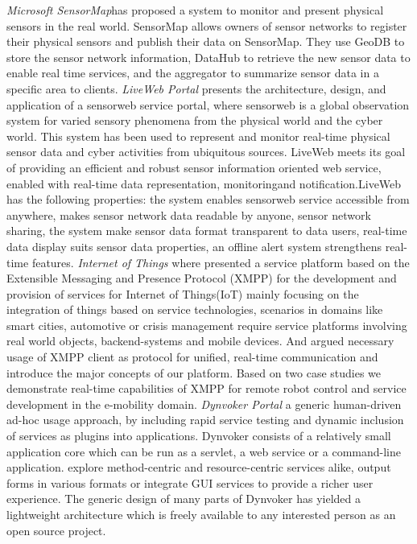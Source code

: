 \newline
	\emph{Microsoft SensorMap\cite{nath2007sensormap}}has proposed a system to monitor and present physical sensors in the real world. SensorMap allows owners of sensor networks to register their physical sensors and publish their data on SensorMap. They use GeoDB to store the sensor network information, DataHub to retrieve the new sensor data to enable real time services, and the aggregator to summarize sensor data in a specific area to clients.
\newline
	 \emph{LiveWeb Portal}\cite{yang2011liveweb} presents the architecture, design, and application of a sensorweb service portal, where sensorweb is a global observation system for varied sensory phenomena from the physical world and the cyber world. This system has been used to represent and monitor real-time physical sensor data and cyber activities from ubiquitous sources. LiveWeb meets its goal of providing an efficient and robust sensor information oriented web service, enabled with real-time data representation, monitoringand notification.LiveWeb has the following properties: the system enables sensorweb service accessible from anywhere, makes sensor network data readable by anyone, sensor network sharing, the system make sensor data format transparent to data users, real-time data display suits sensor data properties, an offline alert system strengthens real-time features.
\newline
	\emph{Internet of Things}\cite{bendel2013service} where presented a service platform based on the Extensible Messaging and Presence Protocol (XMPP) for the development and provision of services for Internet of Things(IoT) mainly focusing on the integration of things based on service technologies, scenarios in domains like smart cities, automotive or crisis management require service
	platforms involving real world objects, backend-systems and mobile devices. And argued necessary usage of
    XMPP client as protocol for unified, real-time communication and introduce the major concepts of our platform. Based on two case studies we demonstrate real-time capabilities of XMPP for remote robot control and service development in the e-mobility domain.
 \newline
	 \emph{Dynvoker Portal}\cite{spillner2008ad} a generic human-driven ad-hoc usage approach, by including rapid service testing and dynamic inclusion of services as plugins into applications. Dynvoker consists of a relatively small application core which can be run as a servlet, a web service or a command-line application. explore method-centric and resource-centric services alike, output forms in various formats or integrate GUI services to provide a richer user experience. The generic design of many parts of Dynvoker has yielded a lightweight architecture which is freely available to any interested person as an open source project.

